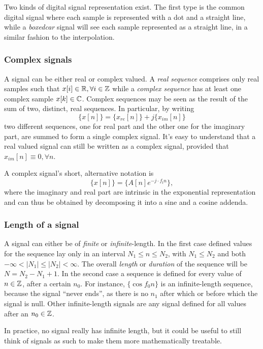 \documentclass[\documentfontsize, twocolumn]{\classname}
\begin{document}
Two kinds of digital signal representation exist. The first type is the common
digital signal where each sample is represented with a dot and a straight
line, while a \emph{boxedcar} signal will see each sample represented as a
straight line, in a similar fashion to the interpolation.

\subsubsection{Complex signals}

A signal can be either real or complex valued. A \emph{real se\-quen\-ce} comprises
only real samples such that $x[i] \in \mathbb R, \forall i \in \mathbb Z$ while a
\emph{complex se\-quen\-ce} has at least one complex sample $x[k] \in \mathbb C$. Complex
se\-quen\-ces may be seen as the result of the sum of two, distinct, real
se\-quen\-ces. In particular, by writing \[\{x[n]\} = \{x_{re}[n]\} +
j\{x_{im}[n]\}\] two different se\-quen\-ces, one for real part and the other one
for the imaginary part, are summed to form a single complex signal. It's easy
to understand that a real valued signal can still be written as a complex
signal, provided that $x_{im}[n] \equiv 0, \forall n$.

A complex signal's short, alternative notation is \[\{x[n]\} = \{A[n]e^{-j\cdot
f_t n}\},\] where the imaginary and real part are intrinsic in the exponential
representation and can thus be obtained by decomposing it into a sine and a
cosine addenda.

\subsubsection{Length of a signal}

A signal can either be of \emph{finite} or \emph{infinite}-length. In the first case defined values for the se\-quen\-ce lay only in an interval $N_1 \leq n \leq N_2$, with $N_1 \leq N_2$ and both $-\infty < |N_1| \leq |N_2| < \infty$. The overall \emph{length} or \emph{duration} of the se\-quen\-ce will be $N = N_2 - N_1 + 1$. In the second case a se\-quen\-ce is defined for every value of $n \in \mathbb Z$, after a certain $n_0$. For instance, $\{\cos{f_0 n}\}$ is an infinite-length se\-quen\-ce, because the signal ``never ends'', as there is no $n_1$ after which or before which the signal is null. Other infinite-length signals are any signal defined for all values after an $n_0 \in \mathbb Z$.

In practice, no signal really has infinite length, but it could be useful to still think of signals as such to make them more mathematically treatable.
\end{document}
